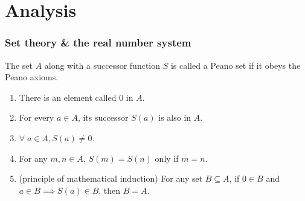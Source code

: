 
\part{Analysis}
\section{Set theory \& the real number system}

\begin{defn} \label{defn:peano}
    The set $A$ along with a successor function $S$ is called a Peano set if it obeys the Peano axioms.
    \begin{enumerate}[label=(P\arabic*)]
        \item \label{defn:peano:zero}
            There is an element called 0 in $A$.
        \item \label{defn:peano:succ}
            For every $a \in A$, its successor $S(a)$ is also in $A$.
        \item \label{defn:peano:not_succ}
            $\forall \; a \in A, S(a) \neq 0$.
        \item \label{defn:peano:injective}
            For any $m, n \in A$, $S(m) = S(n)$ only if $m = n$.
        \item \label{defn:peano:induction}
            (principle of mathematical induction) For any set $B \subseteq A$, if $0 \in B$ and $a \in B \implies S(a) \in B$, then $B = A$.
    \end{enumerate}
\end{defn}
